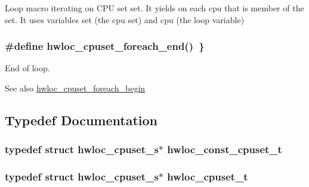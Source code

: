 Loop macro iterating on CPU set {\ttfamily set}. It yields on each cpu that is member of the set. It uses variables {\ttfamily set} (the cpu set) and {\ttfamily cpu} (the loop variable) \hypertarget{group__hwlocality__cpuset_gae2974be78a7d7cddbd38cb23fcc6240a}{
\subsubsection[{hwloc\_\-cpuset\_\-foreach\_\-end}]{\setlength{\rightskip}{0pt plus 5cm}\#define hwloc\_\-cpuset\_\-foreach\_\-end()~\}}}
\label{group__hwlocality__cpuset_gae2974be78a7d7cddbd38cb23fcc6240a}


End of loop. \begin{DoxySeeAlso}{See also}
\hyperlink{group__hwlocality__cpuset_ga8f896ce703ad1740fdf9ce8ac6361359}{hwloc\_\-cpuset\_\-foreach\_\-begin} 
\end{DoxySeeAlso}


\subsection{Typedef Documentation}
\hypertarget{group__hwlocality__cpuset_gad2f7833583d020af31e01554251dbe11}{
\subsubsection[{hwloc\_\-const\_\-cpuset\_\-t}]{\setlength{\rightskip}{0pt plus 5cm}typedef struct hwloc\_\-cpuset\_\-s$\ast$ {\bf hwloc\_\-const\_\-cpuset\_\-t}}}
\label{group__hwlocality__cpuset_gad2f7833583d020af31e01554251dbe11}
\hypertarget{group__hwlocality__cpuset_ga7366332f7090f5b54d4b25a0c2c4b411}{
\subsubsection[{hwloc\_\-cpuset\_\-t}]{\setlength{\rightskip}{0pt plus 5cm}typedef struct hwloc\_\-cpuset\_\-s$\ast$ {\bf hwloc\_\-cpuset\_\-t}}}
\label{group__hwlocality__cpuset_ga7366332f7090f5b54d4b25a0c2c4b411}


